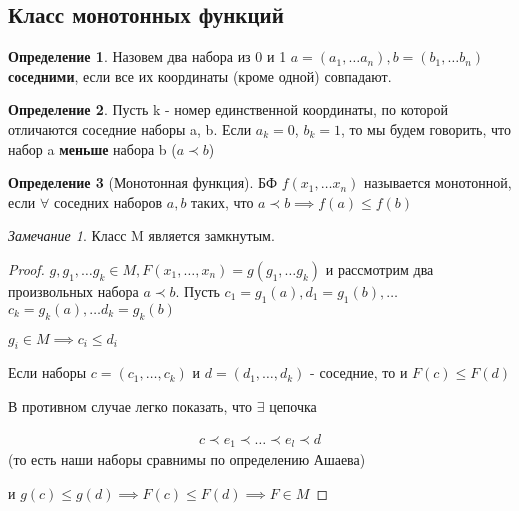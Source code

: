 \documentclass[a4paper]{article}
\theoremstyle{definition}
\newtheorem*{definition}{Определение}
\theoremstyle{remark}
\newtheorem*{remark}{Замечание}
\begin{document}
    \subsection{Класс монотонных функций}
    \begin{definition}
        Назовем два набора из 0 и 1 $a = (a_1, \dots a_n), b = (b_1, \dots b_n)$
        \textbf{соседними}, если все их координаты (кроме одной) совпадают.
    \end{definition}
    \begin{definition}
        Пусть k - номер единственной координаты, по которой отличаются соседние наборы a, b.
        Если $a_k = 0$, $b_k = 1$, то мы будем говорить, что набор a \textbf{меньше} набора b
        ($a\prec b$)
    \end{definition}
    \begin{definition}[Монотонная функция]
        БФ $f(x_1, \dots x_n)$ называется монотонной, если
        $\forall$ соседних наборов $a,b$ таких, что $a\prec b\implies f(a) \leq f(b)$
    \end{definition}
    \begin{remark}
        Класс M является замкнутым.
    \end{remark}
    \begin{proof}
        $g, g_1, \dots g_k \in M, F(x_1, \dots, x_n) = g(g_1, \dots g_k)$
        и рассмотрим два произвольных набора $a\prec b$. Пусть $c_1 = g_1(a), d_1 = g_1(b), \dots$
        $c_k = g_k(a), \dots d_k = g_k(b)$

        $g_i \in M \implies c_i\leq d_i $

        Если наборы $c = (c_1, \dots, c_k)$ и $d = (d_1, \dots, d_k)$ - соседние,
        то и $F(c)\leq F(d)$

        В противном случае легко показать, что $\exists$ цепочка

        \begin{align*}
            c \prec e_1 \prec\dots\prec e_l \prec d
        \end{align*}
        (то есть наши наборы сравнимы по определению Ашаева)
        
        и $g(c) \leq g(d)\implies F(c) \leq F(d) \implies F\in M$
    \end{proof}
\end{document}
